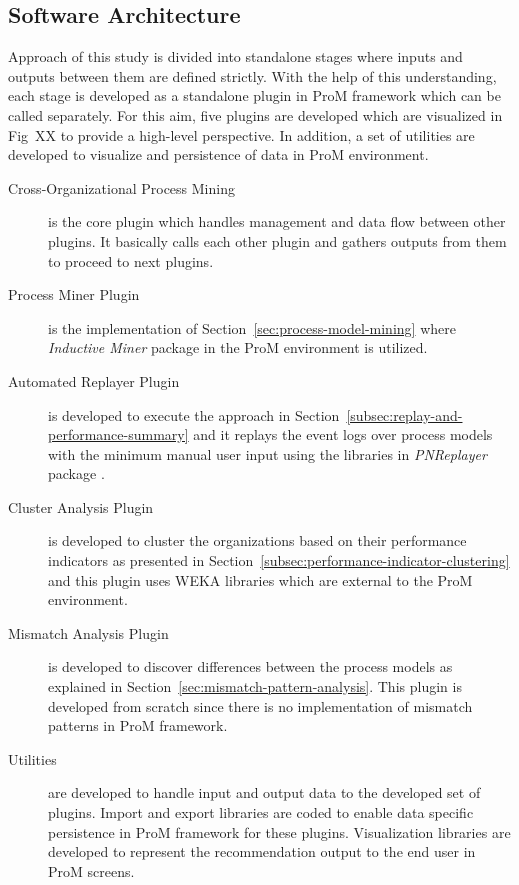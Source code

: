 \subsection{Software Architecture}
\label{subsec:architecture}
Approach of this study is divided into standalone stages where inputs and outputs between them are defined strictly. With the help of this understanding, each stage is developed as a standalone plugin in ProM framework which can be called separately. For this aim, five plugins are developed which are visualized in Fig~XX to provide a high-level perspective. In addition, a set of utilities are developed to visualize and persistence of data in ProM environment. 
\begin{description}
  \item[Cross-Organizational Process Mining] is the core plugin which handles management and data flow between other plugins. It basically calls each other plugin and gathers outputs from them to proceed to next plugins. 
  \item[Process Miner Plugin] is the implementation of Section~\ref{sec:process-model-mining} where \textit{Inductive Miner} \cite{leemans2014discoveringinfrequent} package in the ProM environment is utilized. 
  \item[Automated Replayer Plugin] is developed to execute the approach in Section~\ref{subsec:replay-and-performance-summary} and it replays the event logs over process models with the minimum manual user input using the libraries in \textit{PNReplayer} package \cite{adriansyah2011towards}. 
  \item[Cluster Analysis Plugin] is developed to cluster the organizations based on their performance indicators as presented in Section~\ref{subsec:performance-indicator-clustering} and this plugin uses WEKA libraries \cite{hall2009} which are external to the ProM environment. 
  \item[Mismatch Analysis Plugin] is developed to discover differences between the process models as explained in Section~\ref{sec:mismatch-pattern-analysis}. This plugin is developed from scratch since there is no implementation of mismatch patterns \cite{dijkman2007mismatch} in ProM framework.
  \item[Utilities] are developed to handle input and output data to the developed set of plugins. Import and export libraries are coded to enable data specific persistence in ProM framework for these plugins. Visualization libraries are developed to represent the recommendation output to the end user in ProM screens.
\end{description}   

